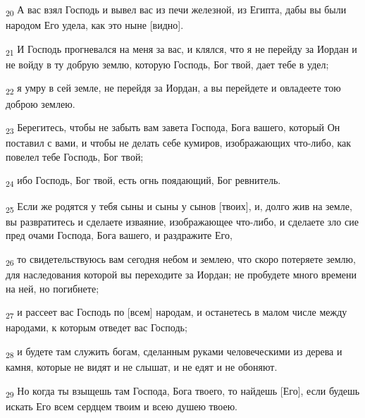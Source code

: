 \begin{tcolorbox}
\textsubscript{20} А вас взял Господь и вывел вас из печи железной, из Египта, дабы вы были народом Его удела, как это ныне [видно].
\end{tcolorbox}
\begin{tcolorbox}
\textsubscript{21} И Господь прогневался на меня за вас, и клялся, что я не перейду за Иордан и не войду в ту добрую землю, которую Господь, Бог твой, дает тебе в удел;
\end{tcolorbox}
\begin{tcolorbox}
\textsubscript{22} я умру в сей земле, не перейдя за Иордан, а вы перейдете и овладеете тою доброю землею.
\end{tcolorbox}
\begin{tcolorbox}
\textsubscript{23} Берегитесь, чтобы не забыть вам завета Господа, Бога вашего, который Он поставил с вами, и чтобы не делать себе кумиров, изображающих что-либо, как повелел тебе Господь, Бог твой;
\end{tcolorbox}
\begin{tcolorbox}
\textsubscript{24} ибо Господь, Бог твой, есть огнь поядающий, Бог ревнитель.
\end{tcolorbox}
\begin{tcolorbox}
\textsubscript{25} Если же родятся у тебя сыны и сыны у сынов [твоих], и, долго жив на земле, вы развратитесь и сделаете изваяние, изображающее что-либо, и сделаете зло сие пред очами Господа, Бога вашего, и раздражите Его,
\end{tcolorbox}
\begin{tcolorbox}
\textsubscript{26} то свидетельствуюсь вам сегодня небом и землею, что скоро потеряете землю, для наследования которой вы переходите за Иордан; не пробудете много времени на ней, но погибнете;
\end{tcolorbox}
\begin{tcolorbox}
\textsubscript{27} и рассеет вас Господь по [всем] народам, и останетесь в малом числе между народами, к которым отведет вас Господь;
\end{tcolorbox}
\begin{tcolorbox}
\textsubscript{28} и будете там служить богам, сделанным руками человеческими из дерева и камня, которые не видят и не слышат, и не едят и не обоняют.
\end{tcolorbox}
\begin{tcolorbox}
\textsubscript{29} Но когда ты взыщешь там Господа, Бога твоего, то найдешь [Его], если будешь искать Его всем сердцем твоим и всею душею твоею.
\end{tcolorbox}
